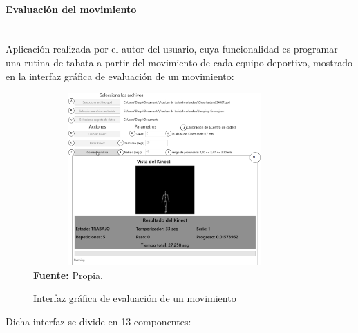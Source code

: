 \paragraph{Evaluaci\'on del movimiento}\mbox{} \\\label{ins:UI:wpf:evaluate}
Aplicaci\'on realizada por el autor del usuario, cuya funcionalidad es programar una rutina de tabata a partir del movimiento de cada equipo deportivo, mostrado en la interfaz gr\'afica de evaluaci\'on de un movimiento:
\begin{figure}[H]
	\caption{Interfaz gr\'afica de evaluaci\'on de un movimiento}
	\label{fig:appEvaluate}
	\centering
	\includegraphics[width=380px,height=250px]{graphics/appEvaluacion.png} \\
	\textbf{Fuente:} Propia.
\end{figure}
Dicha interfaz se divide en 13 componentes:
